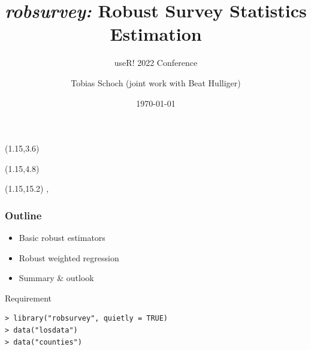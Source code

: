 \documentclass[framenumber,t]{beamer}
\begin{document}
\title[robsurvey: useR! 2022 conference]{\emph{robsurvey:} Robust Survey Statistics Estimation}
\subtitle{useR! 2022 Conference}

\author[Tobias Schoch]{Tobias Schoch (joint work with Beat Hulliger)}
\date{\today}

{
\begin{frame}
    \begin{textblock}{20}(1.15,3.6)
        \Large\bfseries\color{fhnwblue}\inserttitle
    \end{textblock}
    \begin{textblock}{20}(1.15,4.8)
        \small\bfseries\color{fhnwblue}\insertsubtitle
    \end{textblock}
    \begin{textblock}{20}(1.15,15.2)
        \scriptsize\color{black}\insertauthor, ~\insertdate
    \end{textblock}
    \vspace*{3.3cm}\hspace{-1.2cm}%
\end{frame}
}
\addtocounter{framenumber}{-1}
\begin{frame}[fragile]
\frametitle{Outline}
    \begin{itemize}
        \setlength\itemsep{0.75em}
        \item Basic robust estimators
        \item Robust weighted regression
        \item Summary \& outlook
    \end{itemize}
    \vspace{3em}
    \begin{minipage}{6cm}
        \alert{Requirement}
    \end{minipage}
    \begin{lstlisting}[style=in_big]
> library("robsurvey", quietly = TRUE)
> data("losdata")
> data("counties")
    \end{lstlisting}
\end{frame}
\end{document}
